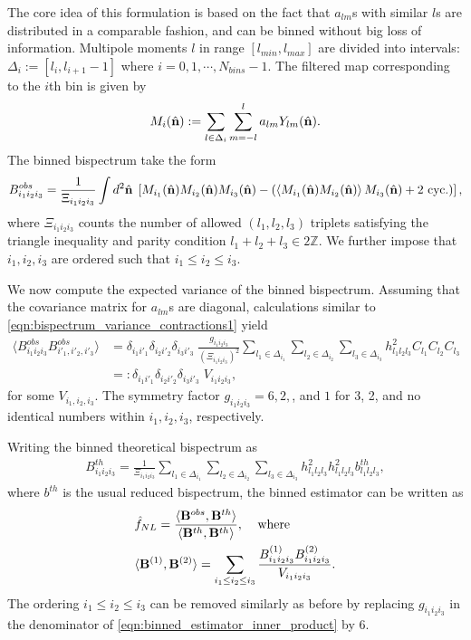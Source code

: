 The core idea of this formulation is based on the fact that $a_{lm}$s with similar $l$s are distributed in a comparable fashion, and can be binned without big loss of information. Multipole moments $l$ in range $[l_{min},l_{max}]$ are divided into intervals: $\Delta_i := [l_i,l_{i+1}-1]$ where $i=0,1,\cdots,N_{bins}-1$.  The filtered map corresponding to the $i$th bin is given by
\begin{align}
		M_i(\hat{\mathbf{n}}) := \sum_{l\in\Delta_i}\sum_{m=-l}^{l} a_{lm} Y_{lm}(\hat{\mathbf{n}}).
\end{align}
The binned bispectrum take the form
\begin{align}
	B^{obs}_{i_1 i_2 i_3} = \frac{1}{\Xi_{i_1 i_2 i_3}} \int d^2 \hat{\mathbf{n}} \; \left[ M_{i_1} (\hat{\mathbf{n}}) M_{i_2} (\hat{\mathbf{n}}) M_{i_3} (\hat{\mathbf{n}}) - \left( \left< M_{i_1} (\hat{\mathbf{n}}) M_{i_2} (\hat{\mathbf{n}}) \right> M_{i_3} (\hat{\mathbf{n}}) + \text{2 cyc.}\right)  \right],
\end{align}
where $\Xi_{i_1 i_2 i_3}$ counts the number of allowed $(l_1,l_2,l_3)$ triplets satisfying the triangle inequality and parity condition $l_1+l_2+l_3 \in 2\mathbb{Z}$. We further impose that $i_1,i_2,i_3$ are ordered such that $i_1 \le i_2 \le i_3$.

We now compute the expected variance of the binned bispectrum. Assuming that the covariance matrix for $a_{lm}$s are diagonal, calculations similar to \eqref{eqn:bispectrum_variance_contractions1} yield
\begin{align}
	\langle B^{obs}_{i_1 i_2 i_3} B^{obs}_{i'_1,i'_2,i'_3} \rangle &=  \delta_{i_1 i'_1} \delta_{i_2 i'_2} \delta_{i_3 i'_3} \; \frac{g_{i_1 i_2 i_3}}{(\Xi_{i_1 i_2 i_3})^2} \sum_{l_1 \in \Delta_{i_1}} \sum_{l_2 \in \Delta_{i_2}} \sum_{l_3 \in \Delta_{i_3}} h^2_{l_1 l_2 l_3} C_{l_1} C_{l_2} C_{l_3} \\
	&=: \delta_{i_1 i'_1} \delta_{i_2 i'_2} \delta_{i_3 i'_3} \; V_{i_1 i_2 i_3},
\end{align}
for some $V_{i_1,i_2,i_3}$. The symmetry factor $g_{i_1 i_2 i_3}=6,2,$, and $1$ for 3, 2, and no identical numbers within $i_1,i_2,i_3$, respectively.

Writing the binned theoretical bispectrum as
\begin{align}
	B^{th}_{i_1 i_2 i_3} =  \frac{1}{\Xi_{i_1 i_2 i_3}} \sum_{l_1 \in \Delta_{i_1}} \sum_{l_2 \in \Delta_{i_2}} \sum_{l_3 \in \Delta_{i_3}} h^2_{l_1 l_2 l_3} h^2_{l_1 l_2 l_3} b^{th}_{l_1 l_2 l_3}, \label{eqn:binned_estimator_theoretical_bispectra}
\end{align}
where $b^{th}$ is the usual reduced bispectrum, the binned estimator can be written as
\begin{align}
	&\hat{f}_{NL} = \frac{\langle \mathbf{B}^{obs}, \mathbf{B}^{th} \rangle}{\langle \mathbf{B}^{th}, \mathbf{B}^{th} \rangle}, \;\;\;\;\text{where} \\
	&\langle \mathbf{B}^{(1)}, \mathbf{B}^{(2)} \rangle = \sum_{i_1 \le i_2 \le i_3} \frac{B^{(1)}_{i_1 i_2 i_3} B^{(2)}_{i_1 i_2 i_3}}{V_{i_1 i_2 i_3}}. \label{eqn:binned_estimator_inner_product}
\end{align}
The ordering $i_1 \le i_2 \le i_3$ can be removed similarly as before by replacing $g_{i_1 i_2 i_3}$ in the denominator of \eqref{eqn:binned_estimator_inner_product} by $6$.

